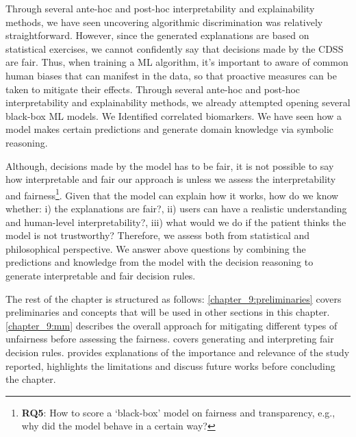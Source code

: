 \hspace*{3.5mm} Through several ante-hoc and post-hoc interpretability and explainability methods, we have seen uncovering algorithmic discrimination was relatively straightforward. However, since the generated explanations are based on statistical exercises, we cannot confidently say that decisions made by the CDSS are fair. Thus, when training a ML algorithm, it's important to aware of common human biases that can manifest in the data, so that proactive measures can be taken to mitigate their effects. %
Through several ante-hoc and post-hoc interpretability and explainability methods, we already attempted opening several black-box ML models. We Identified correlated biomarkers. We have seen how a model makes certain predictions and generate domain knowledge via symbolic reasoning. 

\hspace*{3.5mm} Although, decisions made by the model has to be fair, it is not possible to say how interpretable and fair our approach is unless we assess the interpretability and fairness\footnote{\textbf{RQ5}: How to score a `black-box' model on fairness and transparency, e.g., why did the model behave in a certain way?}. Given that the model can explain how it works, how do we know whether: i) the explanations are fair?, ii) users can have a realistic understanding and human-level interpretability?, iii) what would we do if the patient thinks the model is not trustworthy? Therefore, we assess both from statistical and philosophical perspective.
We answer above questions by combining the predictions and knowledge from the model with the decision reasoning to generate interpretable and fair decision rules. 

\hspace*{3.5mm} The rest of the chapter is structured as follows: 
\cref{chapter_9:preliminaries} covers preliminaries and concepts that will be used in other sections in this chapter. \cref{chapter_9:mm} describes the overall approach for mitigating different types of unfairness before assessing the fairness.  covers generating and interpreting fair decision rules.  provides explanations of the importance and relevance of the study reported, highlights the limitations and discuss  future works before concluding the chapter. 

